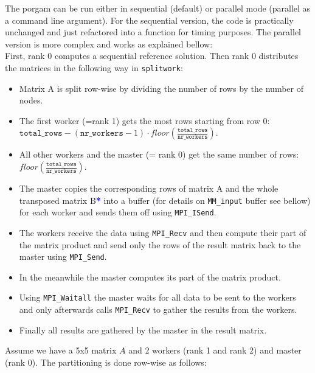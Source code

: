 The porgam can be run either in sequential (default) or parallel mode (parallel as a command line argument). For the sequential version, the code is practically unchanged and just refactored into a function for timing purposes. The parallel version is more complex and works as explained bellow: \\
First, rank 0 computes a sequential reference solution. Then rank 0 distributes the matrices in the following way in \texttt{splitwork}: 
\begin{itemize}
    \item Matrix A is split row-wise by dividing the number of rows by the number of nodes.
    \item The first worker (=rank 1) gets the most rows starting from row 0: \\$\texttt{total\_rows} - (\texttt{nr\_workers}-1) \cdot \textit{floor}(\frac{\texttt{total\_rows}}{\texttt{nr\_workers}})$.
    \item All other workers and the master (= rank 0) get the same number of rows: $\textit{floor}(\frac{\texttt{total\_rows}}{\texttt{nr\_workers}})$.
    \item The master copies the corresponding rows of matrix A and the whole transposed matrix B\textcolor{blue}{\textbf{*}} into a buffer (for details on \texttt{MM\_input} buffer see bellow) for each worker and sends them off using \texttt{MPI\_ISend}.
    \item The workers receive the data using \texttt{MPI\_Recv} and then compute their part of the matrix product and send only the rows of the result matrix back to the master using \texttt{MPI\_Send}.
    \item In the meanwhile the master computes its part of the matrix product.
    \item Using \texttt{MPI\_Waitall} the master waits for all data to be sent to the workers and only afterwards calls \texttt{MPI\_Recv} to gather the results from the workers.
    \item Finally all results are gathered by the master in the result matrix.
\end{itemize}
Assume we have a 5x5 matrix $A$ and 2 workers (rank 1 and rank 2) and master (rank 0). The partitioning is done row-wise as follows:
